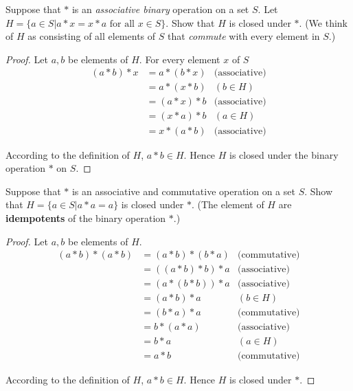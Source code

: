 \begin{exercise}
    Suppose that $*$ is an \textit{associative binary} operation on a set $S$. Let $H = \{ a \in S \vert a * x = x * a \text{ for all } x\in S \}$. Show that $H$ is closed under $*$. (We think of $H$ as consisting of all elements of $S$ that \textit{commute} with every element in $S$.)
\end{exercise}

\begin{proof}
    Let $a, b$ be elements of $H$. For every element $x$ of $S$
    \begin{align*}
        (a * b) * x & = a * (b * x) & \text{(associative)} \\
                    & = a * (x * b) & (b\in H)             \\
                    & = (a * x) * b & \text{(associative)} \\
                    & = (x * a) * b & (a\in H)             \\
                    & = x * (a * b) & \text{(associative)}
    \end{align*}

    According to the definition of $H$, $a * b\in H$. Hence $H$ is closed under the binary operation $*$ on $S$.
\end{proof}

\begin{exercise}
    Suppose that $*$ is an associative and commutative operation on a set $S$. Show that $H = \{ a\in S \vert a * a = a \}$ is closed under $*$. (The element of $H$ are \textbf{idempotents} of the binary operation $*$.)
\end{exercise}

\begin{proof}
    Let $a, b$ be elements of $H$.
    \begin{align*}
        (a * b) * (a * b) & = (a * b) * (b * a) & \text{(commutative)} \\
                          & = ((a * b) * b) * a & \text{(associative)} \\
                          & = (a * (b * b)) * a & \text{(associative)} \\
                          & = (a * b) * a       & (b\in H)             \\
                          & = (b * a) * a       & \text{(commutative)} \\
                          & = b * (a * a)       & \text{(associative)} \\
                          & = b * a             & (a\in H)             \\
                          & = a * b             & \text{(commutative)}
    \end{align*}

    According to the definition of $H$, $a * b\in H$. Hence $H$ is closed under $*$.
\end{proof}

